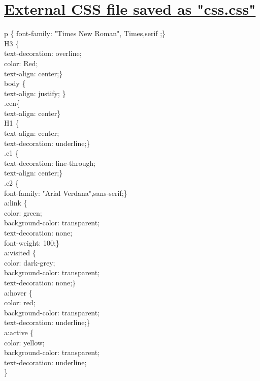 \section*{\fontsize{16}{14}\selectfont \underline{External CSS file saved as "css.css"}}

p \{ font-family: "Times New Roman", Times,serif ;\}\\
H3 \{ \\
text-decoration: overline;\\
 color: Red;\\
text-align: center;\}\\
body \{\\
        text-align: justify;      \}\\
.cen\{\\
       text-align: center\}\\
H1 \{\\
text-align: center;\\
text-decoration: underline;\}\\
.c1 \{\\
text-decoration: line-through;\\
text-align: center;\}\\
.c2 \{\\
font-family: "Arial Verdana",sans-serif;\}\\
a:link \{\\
    color: green;\\
    background-color: transparent;\\
    text-decoration: none;\\
font-weight: 100;\}\\
a:visited \{\\
    color: dark-grey;\\
    background-color: transparent;\\
    text-decoration: none;\}\\
a:hover \{\\
    color: red;\\
    background-color: transparent;\\
    text-decoration: underline;\}\\
a:active \{\\
    color: yellow;\\
    background-color: transparent;\\
    text-decoration: underline;\\
\}\\
